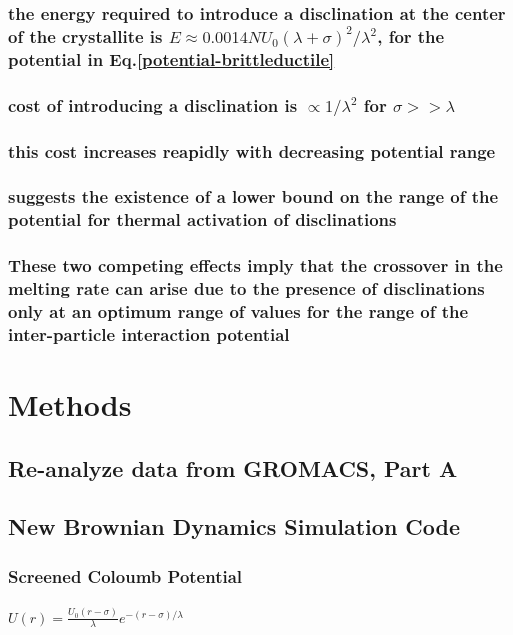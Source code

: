 \documentclass{umthesis}
\begin{document}
\subsubsection{the energy required to introduce a disclination at the center of the crystallite is $E \approx 0.0014 N U_0 (\lambda + \sigma)^2/\lambda^2$, for the potential in Eq.\ref{potential-brittleductile}}
\label{sec-2.1.5.9}
\subsubsection{cost of introducing a disclination is $\propto 1/\lambda^2$ for  $\sigma >> \lambda$}
\label{sec-2.1.5.10}
\subsubsection{this cost increases reapidly with decreasing potential range}
\label{sec-2.1.5.11}
\subsubsection{suggests the existence of a lower bound on the range of the potential for thermal activation of disclinations}
\label{sec-2.1.5.12}
\subsubsection{These two competing effects imply that the crossover in the melting rate can arise due to the presence of disclinations only at an optimum range of values for the range of the inter-particle interaction potential}
\label{sec-2.1.5.13}
\section{Methods}
\label{sec-2.2}
\subsection{Re-analyze data from GROMACS, Part A}
\label{sec-2.2.1}
\subsection{New Brownian Dynamics Simulation Code}
\label{sec-2.2.2}
\subsubsection{Screened Coloumb Potential}
\label{sec-2.2.2.1}
\paragraph{$U(r)=\frac{U_0 (r-\sigma)}{\lambda} e^{-(r-\sigma)/\lambda}$}
\label{sec-2.2.2.1.1}
\end{document}
